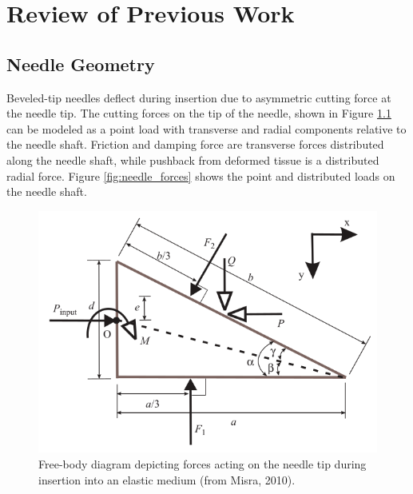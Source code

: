 \chapter{Review of Previous Work}
\label{sec:lit_review} %


\section{Needle Geometry}
Beveled-tip needles deflect during insertion due to asymmetric cutting force at the needle tip. The cutting forces on the tip of the needle, shown in Figure \ref{fig:tip_forces} can be modeled as a point load with transverse  and radial components relative to the needle shaft\cite{misra_mechanics_2010}. Friction and damping force are transverse forces distributed along the needle shaft, while pushback from deformed tissue is a distributed radial force. Figure \ref{fig:needle_forces} shows the point and distributed loads on the needle shaft.

\begin{figure}[h]
\includegraphics[width=1.0\textwidth]{Fig/chap2/misra_tip_forces.png}
\caption{Free-body diagram depicting forces acting on the needle tip during insertion into an elastic medium (from Misra, 2010\cite{misra_mechanics_2010}).}
\label{fig:tip_forces}
\end{figure}

